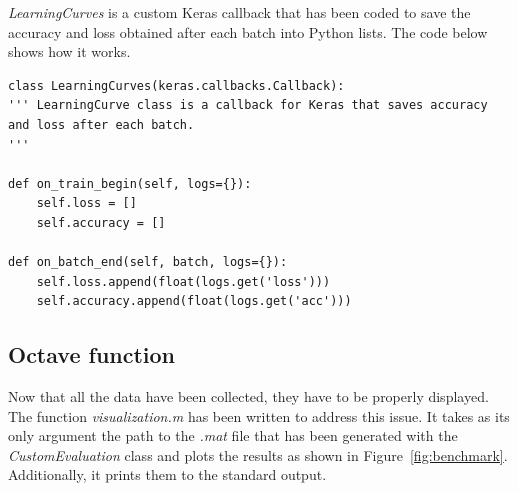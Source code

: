 \emph{\textit{LearningCurves}} is a custom Keras callback that has been coded to save the accuracy and loss obtained after each batch into Python lists. The code below shows how it works.
\begin{lstlisting}
class LearningCurves(keras.callbacks.Callback):
''' LearningCurve class is a callback for Keras that saves accuracy
and loss after each batch.
'''    

def on_train_begin(self, logs={}):
	self.loss = []
	self.accuracy = []

def on_batch_end(self, batch, logs={}):
	self.loss.append(float(logs.get('loss')))
	self.accuracy.append(float(logs.get('acc')))
\end{lstlisting}

\subsection{Octave function}\label{subsec:octave-func}
Now that all the data have been collected, they have to be properly displayed. The function \emph{\textit{visualization.m}} has been written to address this issue. It takes as its only argument the path to the \textit{.mat} file that has been generated with the \textit{CustomEvaluation} class and plots the results as shown in Figure~\ref{fig:benchmark}. Additionally, it prints them to the standard output.

